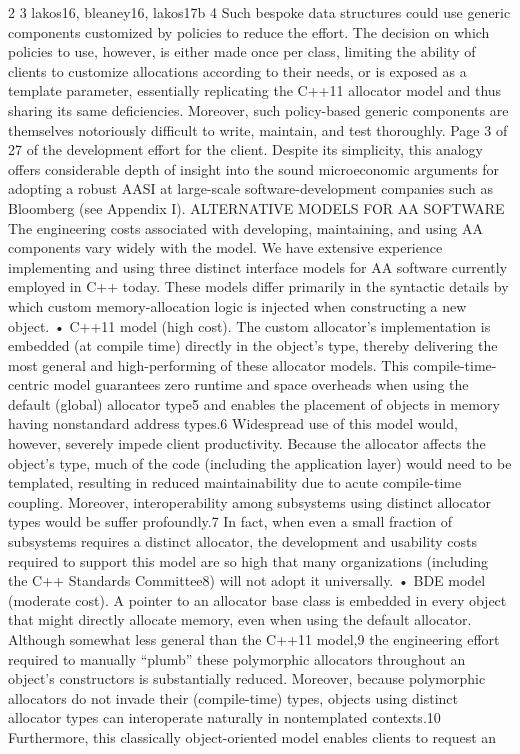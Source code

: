 2 
3 lakos16, bleaney16, lakos17b 4 Such bespoke data structures could use generic components customized by policies to reduce the
effort. The decision on which policies to use, however, is either made once per class, limiting the
ability of clients to customize allocations according to their needs, or is exposed as a template
parameter, essentially replicating the C++11 allocator model and thus sharing its same deficiencies.
Moreover, such policy-based generic components are themselves notoriously difficult to write,
maintain, and test thoroughly.
Page 3 of 27
of the development effort for the client. Despite its simplicity, this analogy offers
considerable depth of insight into the sound microeconomic arguments for adopting
a robust AASI at large-scale software-development companies such as Bloomberg
(see Appendix I).
ALTERNATIVE MODELS FOR AA SOFTWARE
The engineering costs associated with developing, maintaining, and using AA
components vary widely with the model. We have extensive experience implementing
and using three distinct interface models for AA software currently employed in C++
today. These models differ primarily in the syntactic details by which custom
memory-allocation logic is injected when constructing a new object.
• C++11 model (high cost). The custom allocator’s implementation is embedded
(at compile time) directly in the object’s type, thereby delivering the most general
and high-performing of these allocator models. This compile-time-centric model
guarantees zero runtime and space overheads when using the default (global)
allocator type5 and enables the placement of objects in memory having
nonstandard address types.6 Widespread use of this model would, however,
severely impede client productivity. Because the allocator affects the object’s
type, much of the code (including the application layer) would need to be
templated, resulting in reduced maintainability due to acute compile-time
coupling. Moreover, interoperability among subsystems using distinct allocator
types would be suffer profoundly.7 In fact, when even a small fraction of
subsystems requires a distinct allocator, the development and usability costs
required to support this model are so high that many organizations (including the
C++ Standards Committee8) will not adopt it universally.
• BDE model (moderate cost). A pointer to an allocator base class is embedded in
every object that might directly allocate memory, even when using the default
allocator. Although somewhat less general than the C++11 model,9 the
engineering effort required to manually “plumb” these polymorphic allocators
throughout an object’s constructors is substantially reduced. Moreover, because
polymorphic allocators do not invade their (compile-time) types, objects using
distinct allocator types can interoperate naturally in nontemplated contexts.10
Furthermore, this classically object-oriented model enables clients to request an

